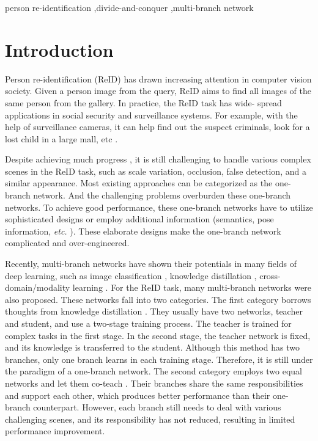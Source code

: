 \documentclass[a4paper]{cas-dc}
\begin{document}
\begin{keywords}
person re-identification \sep divide-and-conquer \sep multi-branch network
\end{keywords}

\maketitle

\section{Introduction}
Person re-identification (ReID) has drawn increasing attention in computer vision society. Given a person image from the query, ReID aims to find all images of the same person from the gallery. In practice, the ReID task has wide- spread applications in social security and surveillance systems. For example, with the help of surveillance cameras, it can help find out the suspect criminals, look for a lost child in a large mall, etc \cite{RN123}.

Despite achieving much progress \cite{RN525} \cite{RN526}, it is still challenging to handle various complex scenes in the ReID task, such as scale variation, occlusion, false detection, and a similar appearance. Most existing approaches can be categorized as the one-branch network. And the challenging problems overburden these one-branch networks. To achieve good performance, these one-branch networks have to utilize sophisticated designs or employ additional information (semantics, pose information, \textit{etc.} \cite{RN345} \cite{RN291} \cite{RN467} \cite{RN229}). These elaborate designs make the one-branch network complicated and over-engineered. 

Recently, multi-branch networks have shown their potentials in many fields of deep learning, such as image classification \cite{RN412} \cite{RN187}, knowledge distillation \cite{RN444} \cite{RN438}, cross-domain/modality learning \cite{RN339} \cite{RN535}. For the ReID task, many multi-branch networks were also proposed. These networks fall into two categories. The first category borrows thoughts from knowledge distillation \cite{RN415} \cite{RN427}. They usually have two networks, teacher and student, and use a two-stage training process. The teacher is trained for complex tasks in the first stage. In the second stage, the teacher network is fixed, and its knowledge is transferred to the student. Although this method has two branches, only one branch learns in each training stage. Therefore, it is still under the paradigm of a one-branch network. The second category employs two equal networks and let them co-teach \cite{RN445} \cite{RN428} \cite{RN339}. Their branches share the same responsibilities and support each other, which produces better performance than their one-branch counterpart. However, each branch still needs to deal with various challenging scenes, and its responsibility has not reduced, resulting in limited performance improvement. 
\end{document}
